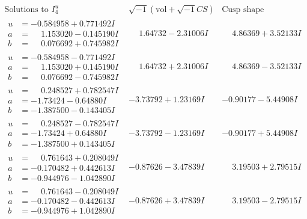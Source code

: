 \documentclass[1p]{elsarticle_modified}
\theoremstyle{definition}
\newcommand{\I}{\sqrt{-1}}
\begin{document}
$$\begin{array}{c|c|c}  
\text{Solutions to }I^u_{4}& \I (\text{vol} + \sqrt{-1}CS) & \text{Cusp shape}\\
 \hline 
\begin{aligned}
u &= -0.584958 + 0.771492 I \\
a &= \phantom{-}1.153020 - 0.145190 I \\
b &= \phantom{-}0.076692 + 0.745982 I\end{aligned}
 & \phantom{-}1.64732 - 2.31006 I & \phantom{-}4.86369 + 3.52133 I \\ \hline\begin{aligned}
u &= -0.584958 - 0.771492 I \\
a &= \phantom{-}1.153020 + 0.145190 I \\
b &= \phantom{-}0.076692 - 0.745982 I\end{aligned}
 & \phantom{-}1.64732 + 2.31006 I & \phantom{-}4.86369 - 3.52133 I \\ \hline\begin{aligned}
u &= \phantom{-}0.248527 + 0.782547 I \\
a &= -1.73424 - 0.64880 I \\
b &= -1.387500 - 0.143405 I\end{aligned}
 & -3.73792 + 1.23169 I & -0.90177 - 5.44908 I \\ \hline\begin{aligned}
u &= \phantom{-}0.248527 - 0.782547 I \\
a &= -1.73424 + 0.64880 I \\
b &= -1.387500 + 0.143405 I\end{aligned}
 & -3.73792 - 1.23169 I & -0.90177 + 5.44908 I \\ \hline\begin{aligned}
u &= \phantom{-}0.761643 + 0.208049 I \\
a &= -0.170482 + 0.442613 I \\
b &= -0.944976 - 1.042890 I\end{aligned}
 & -0.87626 - 3.47839 I & \phantom{-}3.19503 + 2.79515 I \\ \hline\begin{aligned}
u &= \phantom{-}0.761643 - 0.208049 I \\
a &= -0.170482 - 0.442613 I \\
b &= -0.944976 + 1.042890 I\end{aligned}
 & -0.87626 + 3.47839 I & \phantom{-}3.19503 - 2.79515 I \\ \hline\begin{aligned}

\end{aligned}
\end{array}$$
\end{document}

